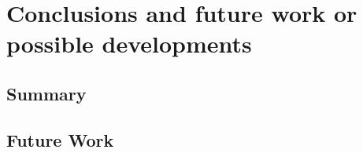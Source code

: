 \section{Conclusions and future work or possible developments} \label{conclusions}
\subsection{Summary}
\subsection{Future Work}